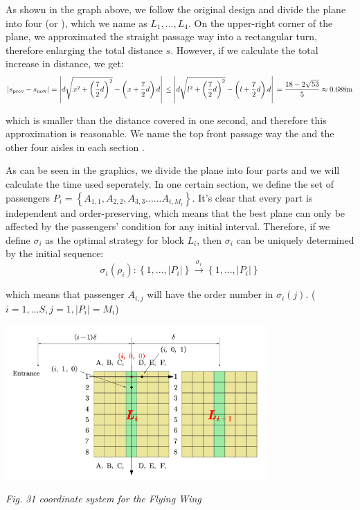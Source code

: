 \documentclass{article}
\theoremstyle{definition}
\theoremstyle{remark}
\numberwithin{equation}{section}
\begin{document}
	As shown in the graph above, we follow the original design and divide the plane into four  (or ), which we name as \(L_1,\ldots,L_4\). On the upper-right corner of the plane, we approximated the straight passage way into a rectangular turn, therefore enlarging the total distance \(s\). However, if we calculate the total increase in distance, we get:
	$$\left| s_{\mathrm{prev}}-s_{\mathrm{now}} \right|=\left| d\sqrt{x^2+\left( \frac{7}{2}d \right) ^2}-\left( x+\frac{7}{2}d \right) d \right|\\\le \left| d\sqrt{l^2+\left( \frac{7}{2}d \right) ^2}-\left( l+\frac{7}{2}d \right) d \right|\\=\frac{18-2\sqrt{53}}{5}\approx 0.688\mathrm{m}\\$$

	which is smaller than the distance covered in one second, and therefore this approximation is reasonable. We name the top front passage way the  and the other four aisles in each section .

	As can be seen in the graphics, we divide the plane into four parts and we will calculate the time used seperately. In one certain section, we define the set of passengers $P_i=\left\{A_{1,1},A_{2,2},A_{3,3}......A_{i,M_i}\right\}$. It's clear that every part is independent and order-preserving, which means that the best plane can only be affected by the passengers' condition for any initial interval. Therefore, if we define \(\sigma_i\) as the optimal strategy for block \(L_i\), then \(\sigma_i\) can be uniquely determined by the initial sequence:
	\[\sigma_i (\rho_i): \left\{1,..., \left|P_i\right|\right\}\xrightarrow{\sigma_i} \left\{1,..., \left|P_i\right| \right\}\]

	which means that passenger $A_{i,j}$ will have the order number in $\sigma_i (j)$. ($i=1,...S, j=1, \left|P_i \right|=M_i$)

	\begin{center}
		\includegraphics[width = 10cm]{deltad.jpg}

		\small\textit{Fig. 31 coordinate system for the Flying Wing}
	\end{center}
\end{document}
